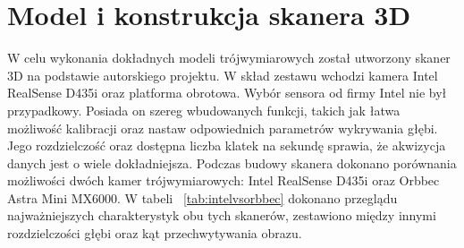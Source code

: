\section{Model i konstrukcja skanera 3D}
W celu wykonania dokładnych modeli trójwymiarowych został utworzony skaner 3D na podstawie autorskiego projektu. W skład zestawu wchodzi kamera Intel RealSense D435i oraz platforma obrotowa. Wybór sensora od firmy Intel nie był przypadkowy. Posiada on szereg wbudowanych funkcji, takich jak łatwa możliwość kalibracji oraz nastaw odpowiednich parametrów wykrywania głębi. Jego rozdzielczość oraz dostępna liczba klatek na sekundę sprawia, że akwizycja danych jest o wiele dokładniejsza. Podczas budowy skanera dokonano porównania możliwości dwóch kamer trójwymiarowych: Intel RealSense D435i oraz Orbbec Astra Mini MX6000. W tabeli ~\ref{tab:intelvsorbbec} dokonano przeglądu najważniejszych charakterystyk obu tych skanerów, zestawiono między innymi rozdzielczości głębi oraz kąt przechwytywania obrazu.

